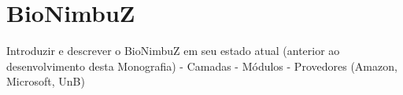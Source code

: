 
\chapter{BioNimbuZ} \label{cap3}

Introduzir e descrever o BioNimbuZ em seu estado atual (anterior ao desenvolvimento desta Monografia)
- Camadas
- Módulos
- Provedores (Amazon, Microsoft, UnB) 

 

	

